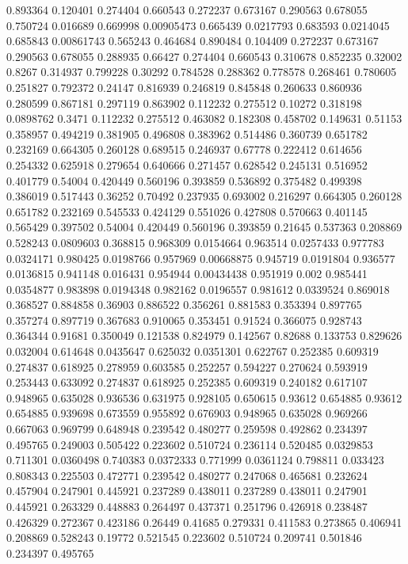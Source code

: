 0.893364 0.120401
0.274404 0.660543
0.272237 0.673167
0.290563 0.678055
0.750724 0.016689
0.669998 0.00905473
0.665439 0.0217793
0.683593 0.0214045
0.685843 0.00861743
0.565243 0.464684
0.890484 0.104409
0.272237 0.673167
0.290563 0.678055
0.288935 0.66427
0.274404 0.660543
0.310678 0.852235
0.32002 0.8267
0.314937 0.799228
0.30292 0.784528
0.288362 0.778578
0.268461 0.780605
0.251827 0.792372
0.24147 0.816939
0.246819 0.845848
0.260633 0.860936
0.280599 0.867181
0.297119 0.863902
0.112232 0.275512
0.10272 0.318198
0.0898762 0.3471
0.112232 0.275512
0.463082 0.182308
0.458702 0.149631
0.51153 0.358957
0.494219 0.381905
0.496808 0.383962
0.514486 0.360739
0.651782 0.232169
0.664305 0.260128
0.689515 0.246937
0.67778 0.222412
0.614656 0.254332
0.625918 0.279654
0.640666 0.271457
0.628542 0.245131
0.516952 0.401779
0.54004 0.420449
0.560196 0.393859
0.536892 0.375482
0.499398 0.386019
0.517443 0.36252
0.70492 0.237935
0.693002 0.216297
0.664305 0.260128
0.651782 0.232169
0.545533 0.424129
0.551026 0.427808
0.570663 0.401145
0.565429 0.397502
0.54004 0.420449
0.560196 0.393859
0.21645 0.537363
0.208869 0.528243
0.0809603 0.368815
0.968309 0.0154664
0.963514 0.0257433
0.977783 0.0324171
0.980425 0.0198766
0.957969 0.00668875
0.945719 0.0191804
0.936577 0.0136815
0.941148 0.016431
0.954944 0.00434438
0.951919 0.002
0.985441 0.0354877
0.983898 0.0194348
0.982162 0.0196557
0.981612 0.0339524
0.869018 0.368527
0.884858 0.36903
0.886522 0.356261
0.881583 0.353394
0.897765 0.357274
0.897719 0.367683
0.910065 0.353451
0.91524 0.366075
0.928743 0.364344
0.91681 0.350049
0.121538 0.824979
0.142567 0.82688
0.133753 0.829626
0.032004 0.614648
0.0435647 0.625032
0.0351301 0.622767
0.252385 0.609319
0.274837 0.618925
0.278959 0.603585
0.252257 0.594227
0.270624 0.593919
0.253443 0.633092
0.274837 0.618925
0.252385 0.609319
0.240182 0.617107
0.948965 0.635028
0.936536 0.631975
0.928105 0.650615
0.93612 0.654885
0.93612 0.654885
0.939698 0.673559
0.955892 0.676903
0.948965 0.635028
0.969266 0.667063
0.969799 0.648948
0.239542 0.480277
0.259598 0.492862
0.234397 0.495765
0.249003 0.505422
0.223602 0.510724
0.236114 0.520485
0.0329853 0.711301
0.0360498 0.740383
0.0372333 0.771999
0.0361124 0.798811
0.033423 0.808343
0.225503 0.472771
0.239542 0.480277
0.247068 0.465681
0.232624 0.457904
0.247901 0.445921
0.237289 0.438011
0.237289 0.438011
0.247901 0.445921
0.263329 0.448883
0.264497 0.437371
0.251796 0.426918
0.238487 0.426329
0.272367 0.423186
0.26449 0.41685
0.279331 0.411583
0.273865 0.406941
0.208869 0.528243
0.19772 0.521545
0.223602 0.510724
0.209741 0.501846
0.234397 0.495765
